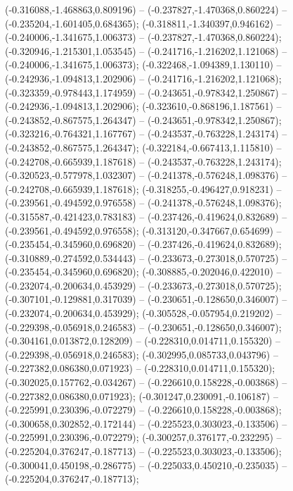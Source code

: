  (-0.316088,-1.468863,0.809196) -- (-0.237827,-1.470368,0.860224) -- (-0.235204,-1.601405,0.684365);
 (-0.318811,-1.340397,0.946162) -- (-0.240006,-1.341675,1.006373) -- (-0.237827,-1.470368,0.860224);
 (-0.320946,-1.215301,1.053545) -- (-0.241716,-1.216202,1.121068) -- (-0.240006,-1.341675,1.006373);
 (-0.322468,-1.094389,1.130110) -- (-0.242936,-1.094813,1.202906) -- (-0.241716,-1.216202,1.121068);
 (-0.323359,-0.978443,1.174959) -- (-0.243651,-0.978342,1.250867) -- (-0.242936,-1.094813,1.202906);
 (-0.323610,-0.868196,1.187561) -- (-0.243852,-0.867575,1.264347) -- (-0.243651,-0.978342,1.250867);
 (-0.323216,-0.764321,1.167767) -- (-0.243537,-0.763228,1.243174) -- (-0.243852,-0.867575,1.264347);
 (-0.322184,-0.667413,1.115810) -- (-0.242708,-0.665939,1.187618) -- (-0.243537,-0.763228,1.243174);
 (-0.320523,-0.577978,1.032307) -- (-0.241378,-0.576248,1.098376) -- (-0.242708,-0.665939,1.187618);
 (-0.318255,-0.496427,0.918231) -- (-0.239561,-0.494592,0.976558) -- (-0.241378,-0.576248,1.098376);
 (-0.315587,-0.421423,0.783183) -- (-0.237426,-0.419624,0.832689) -- (-0.239561,-0.494592,0.976558);
 (-0.313120,-0.347667,0.654699) -- (-0.235454,-0.345960,0.696820) -- (-0.237426,-0.419624,0.832689);
 (-0.310889,-0.274592,0.534443) -- (-0.233673,-0.273018,0.570725) -- (-0.235454,-0.345960,0.696820);
 (-0.308885,-0.202046,0.422010) -- (-0.232074,-0.200634,0.453929) -- (-0.233673,-0.273018,0.570725);
 (-0.307101,-0.129881,0.317039) -- (-0.230651,-0.128650,0.346007) -- (-0.232074,-0.200634,0.453929);
 (-0.305528,-0.057954,0.219202) -- (-0.229398,-0.056918,0.246583) -- (-0.230651,-0.128650,0.346007);
 (-0.304161,0.013872,0.128209) -- (-0.228310,0.014711,0.155320) -- (-0.229398,-0.056918,0.246583);
 (-0.302995,0.085733,0.043796) -- (-0.227382,0.086380,0.071923) -- (-0.228310,0.014711,0.155320);
 (-0.302025,0.157762,-0.034267) -- (-0.226610,0.158228,-0.003868) -- (-0.227382,0.086380,0.071923);
 (-0.301247,0.230091,-0.106187) -- (-0.225991,0.230396,-0.072279) -- (-0.226610,0.158228,-0.003868);
 (-0.300658,0.302852,-0.172144) -- (-0.225523,0.303023,-0.133506) -- (-0.225991,0.230396,-0.072279);
 (-0.300257,0.376177,-0.232295) -- (-0.225204,0.376247,-0.187713) -- (-0.225523,0.303023,-0.133506);
 (-0.300041,0.450198,-0.286775) -- (-0.225033,0.450210,-0.235035) -- (-0.225204,0.376247,-0.187713);
